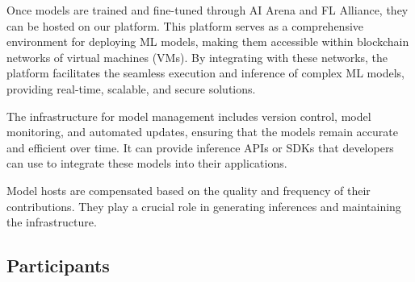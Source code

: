 \documentclass[conference]{IEEEtran}
\begin{document}
Once models are trained and fine-tuned through AI Arena and FL Alliance, they can be hosted on our platform. This platform serves as a comprehensive environment for deploying ML models, making them accessible within blockchain networks of virtual machines (VMs). By integrating with these networks, the platform facilitates the seamless execution and inference of complex ML models, providing real-time, scalable, and secure solutions.

The infrastructure for model management includes version control, model monitoring, and automated updates, ensuring that the models remain accurate and efficient over time. It can provide inference APIs or SDKs that developers can use to integrate these models into their applications.

Model hosts are compensated based on the quality and frequency of their contributions. They play a crucial role in generating inferences and maintaining the infrastructure.


\subsection{Participants}
\end{document}
